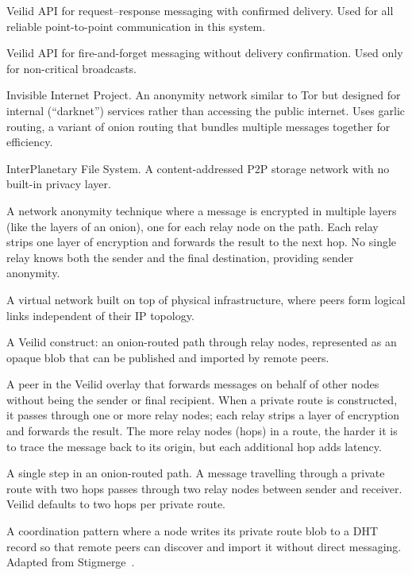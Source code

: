 \begin{description}[style=nextline, labelwidth=5cm, leftmargin=5.5cm]
  \item[\texttt{app\_call}] Veilid API for request--response messaging with confirmed delivery. Used for all reliable point-to-point communication in this system.
  \item[\texttt{app\_message}] Veilid API for fire-and-forget messaging without delivery confirmation. Used only for non-critical broadcasts.
  \item[I2P] Invisible Internet Project. An anonymity network similar to Tor but designed for internal (``darknet'') services rather than accessing the public internet. Uses garlic routing, a variant of onion routing that bundles multiple messages together for efficiency.
  \item[IPFS] InterPlanetary File System. A content-addressed P2P storage network with no built-in privacy layer.
  \item[Onion routing] A network anonymity technique where a message is encrypted in multiple layers (like the layers of an onion), one for each relay node on the path. Each relay strips one layer of encryption and forwards the result to the next hop. No single relay knows both the sender and the final destination, providing sender anonymity.
  \item[Overlay network] A virtual network built on top of physical infrastructure, where peers form logical links independent of their IP topology.
  \item[Private route] A Veilid construct: an onion-routed path through relay nodes, represented as an opaque blob that can be published and imported by remote peers.
  \item[Relay node] A peer in the Veilid overlay that forwards messages on behalf of other nodes without being the sender or final recipient. When a private route is constructed, it passes through one or more relay nodes; each relay strips a layer of encryption and forwards the result. The more relay nodes (hops) in a route, the harder it is to trace the message back to its origin, but each additional hop adds latency.
  \item[Hop] A single step in an onion-routed path. A message travelling through a private route with two hops passes through two relay nodes between sender and receiver. Veilid defaults to two hops per private route.
  \item[Route-in-DHT] A coordination pattern where a node writes its private route blob to a DHT record so that remote peers can discover and import it without direct messaging. Adapted from Stigmerge~\cite{stigmerge2024}.

\end{description}
